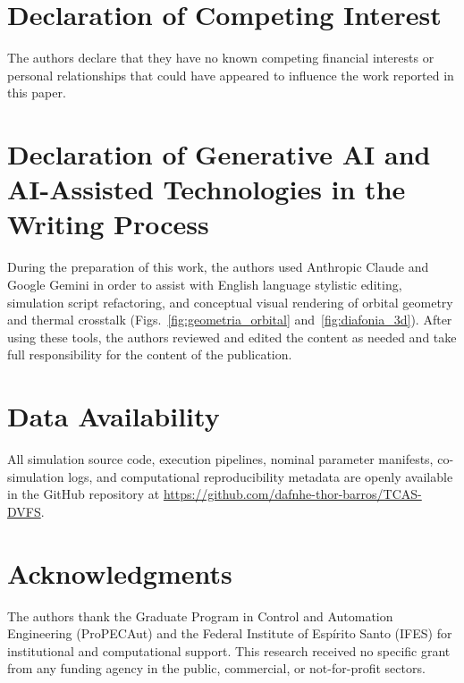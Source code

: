 \documentclass[a4paper,fleqn]{cas-dc}
\begin{document}
\section*{Declaration of Competing Interest}
The authors declare that they have no known competing financial interests or personal relationships that could have appeared to influence the work reported in this paper.

\section*{Declaration of Generative AI and AI-Assisted Technologies in the Writing Process}
During the preparation of this work, the authors used Anthropic Claude and Google Gemini in order to assist with English language stylistic editing, simulation script refactoring, and conceptual visual rendering of orbital geometry and thermal crosstalk (Figs.~\ref{fig:geometria_orbital} and~\ref{fig:diafonia_3d}). After using these tools, the authors reviewed and edited the content as needed and take full responsibility for the content of the publication.

\section*{Data Availability}
All simulation source code, execution pipelines, nominal parameter manifests, co-simulation logs, and computational reproducibility metadata are openly available in the GitHub repository at \url{https://github.com/dafnhe-thor-barros/TCAS-DVFS}.

\section*{Acknowledgments}
The authors thank the Graduate Program in Control and Automation Engineering (ProPECAut) and the Federal Institute of Esp\'irito Santo (IFES) for institutional and computational support. This research received no specific grant from any funding agency in the public, commercial, or not-for-profit sectors.



\end{document}
